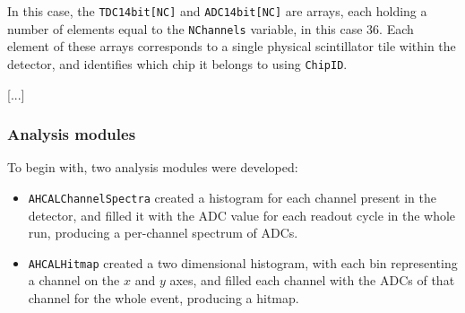 %
%

In this case, the \texttt{TDC14bit[NC]} and \texttt{ADC14bit[NC]} are arrays, each holding a number of elements equal to the \texttt{NChannels} variable, in this case 36. Each element of these arrays corresponds to a single physical scintillator tile within the detector, and identifies which chip it belongs to using \texttt{ChipID}. 

[...]

\subsubsection{Analysis modules}
To begin with, two analysis modules were developed: 

\begin{itemize}
	\item \texttt{AHCALChannelSpectra} created a histogram for each channel present in the detector, and filled it with the ADC value for each readout cycle in the whole run, producing a per-channel spectrum of ADCs.
	\item \texttt{AHCALHitmap} created a two dimensional histogram, with each bin representing a channel on the $x$ and $y$ axes, and filled each channel with the ADCs of that channel for the whole event, producing a hitmap. 
\end{itemize}

